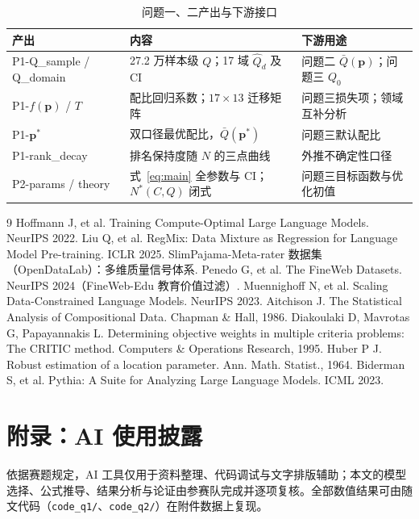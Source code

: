\begin{table}[H]
\centering\small
\caption{问题一、二产出与下游接口}
\begin{tabular}{lll}
\toprule
产出 & 内容 & 下游用途 \\
\midrule
P1-Q\_sample / Q\_domain & 27.2 万样本级 $Q$；17 域 $\hat Q_d$ 及 CI & 问题二 $\bar Q(\bm p)$；问题三 $Q_0$ \\
P1-$f(\bm p)$ / $T$ & 配比回归系数；$17\times13$ 迁移矩阵 & 问题三损失项；领域互补分析 \\
P1-$\bm p^*$ & 双口径最优配比，$\bar Q(\bm p^*)$ & 问题三默认配比 \\
P1-rank\_decay & 排名保持度随 $N$ 的三点曲线 & 外推不确定性口径 \\
P2-params / theory & 式~\eqref{eq:main} 全参数与 CI；$N^*(C,Q)$ 闭式 & 问题三目标函数与优化初值 \\
\bottomrule
\end{tabular}
\label{tab:iface}
\end{table}

\begin{thebibliography}{9}\small
{} Hoffmann J, et al. Training Compute-Optimal Large Language Models. NeurIPS 2022.
 Liu Q, et al. RegMix: Data Mixture as Regression for Language Model Pre-training. ICLR 2025.
 SlimPajama-Meta-rater 数据集（OpenDataLab）：多维质量信号体系.
 Penedo G, et al. The FineWeb Datasets. NeurIPS 2024（FineWeb-Edu 教育价值过滤）.
 Muennighoff N, et al. Scaling Data-Constrained Language Models. NeurIPS 2023.
 Aitchison J. The Statistical Analysis of Compositional Data. Chapman \& Hall, 1986.
 Diakoulaki D, Mavrotas G, Papayannakis L. Determining objective weights in multiple criteria problems: The CRITIC method. Computers \& Operations Research, 1995.
 Huber P J. Robust estimation of a location parameter. Ann. Math. Statist., 1964.
 Biderman S, et al. Pythia: A Suite for Analyzing Large Language Models. ICML 2023.
\end{thebibliography}

\appendix
\section*{附录：AI 使用披露}
依据赛题规定，AI 工具仅用于资料整理、代码调试与文字排版辅助；本文的模型选择、公式推导、结果分析与论证由参赛队完成并逐项复核。全部数值结果可由随文代码（\texttt{code\_q1/}、\texttt{code\_q2/}）在附件数据上复现。
